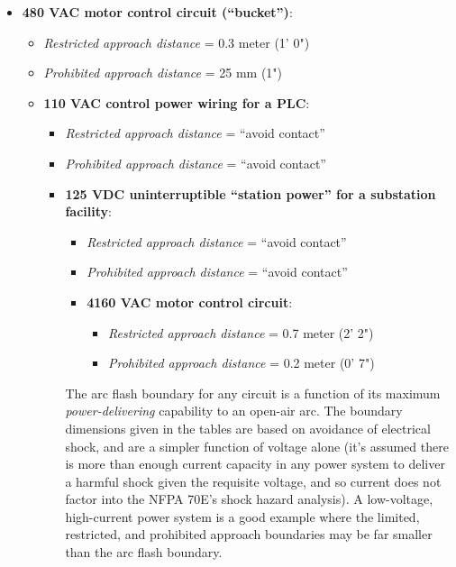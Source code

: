 \begin{itemize}
\item{} {\bf 480 VAC motor control circuit (``bucket'')}:
\begin{itemize}

\item{} {\it Restricted approach distance} = 0.3 meter (1' 0")
\item{} {\it Prohibited approach distance} = 25 mm (1")
\vskip 2pt
\item{} {\bf 110 VAC control power wiring for a PLC}:
\begin{itemize}

\item{} {\it Restricted approach distance} = ``avoid contact''
\item{} {\it Prohibited approach distance} = ``avoid contact'' 
\vskip 2pt
\item{} {\bf 125 VDC uninterruptible ``station power'' for a substation facility}:
\begin{itemize}

\item{} {\it Restricted approach distance} = ``avoid contact''
\item{} {\it Prohibited approach distance} = ``avoid contact'' 
\vskip 2pt
\item{} {\bf 4160 VAC motor control circuit}: 
\begin{itemize}

\item{} {\it Restricted approach distance} = 0.7 meter (2' 2")
\item{} {\it Prohibited approach distance} = 0.2 meter (0' 7")
\end{itemize}
\end{itemize}

\vskip 10pt

The arc flash boundary for any circuit is a function of its maximum {\it power-delivering} capability to an open-air arc.  The boundary dimensions given in the tables are based on avoidance of electrical shock, and are a simpler function of voltage alone (it's assumed there is more than enough current capacity in any power system to deliver a harmful shock given the requisite voltage, and so current does not factor into the NFPA 70E's shock hazard analysis).  A low-voltage, high-current power system is a good example where the limited, restricted, and prohibited approach boundaries may be far smaller than the arc flash boundary.














\end{itemize}
\end{itemize}
\end{itemize}
